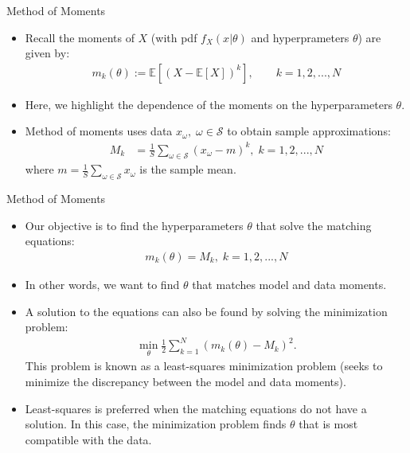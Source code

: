 \documentclass[9pt]{beamer}
\begin{document}
\begin{frame}{Method of Moments}

\begin{itemize}
\item Recall the moments of $X$ (with pdf $f_X(x|\theta)$ and hyperprameters $\theta$) are given by:
\begin{align*}
m_k(\theta):=\mathbb{E}[(X-\mathbb{E}[X])^k], \qquad k=1,2,...,N
\end{align*}
\item Here, we highlight the dependence of the moments on the hyperparameters $\theta$. 

\item Method of moments uses data $x_\omega,\; \omega \in \mathcal{S}$ to obtain sample approximations: 
\begin{align*}
M_k&=\frac{1}{S}\sum_{\omega\in \mathcal{S}}(x_\omega-m)^k, \; k=1,2,...,N
\end{align*}
where $m=\frac{1}{S}\sum_{\omega\in \mathcal{S}}x_\omega$ is the sample mean.

\end{itemize}

\end{frame}


\begin{frame}{Method of Moments}

\begin{itemize}

\item Our objective is to find the hyperparameters $\theta$ that solve the matching equations:
\begin{align*}
m_k(\theta)=M_k,\; k=1,2,...,N
\end{align*}
\item In other words, we want to find $\theta$ that matches model and data moments. 

\item A solution to the equations can also be found by solving the minimization problem:
\begin{align*}
\min_\theta \frac{1}{2}\sum_{k=1}^N(m_k(\theta)-M_k)^2.
\end{align*}
This problem is known as a least-squares minimization problem (seeks to minimize the discrepancy between the model and data moments). 

\item Least-squares is preferred when the matching equations do not have a solution. In this case, the minimization problem finds $\theta$ that is most compatible with the data.  

\end{itemize}

\end{frame}
\end{document}
